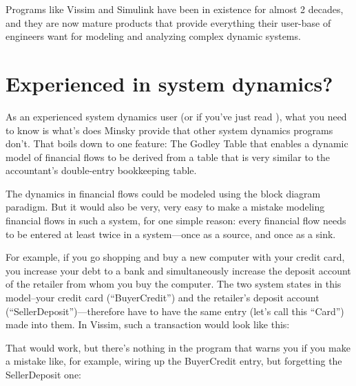 \begin{center}
\end{center}

Programs like Vissim and Simulink have been in existence for almost 2
decades, and they are now mature products that provide everything
their user-base of engineers want for modeling and analyzing complex
dynamic systems. 

\section{Experienced in system dynamics?}
\label{intro:experienced}

As an experienced system dynamics user (or if you've just read ), what you need to know is what's does Minsky
provide that other system dynamics programs don't. That boils down to
one feature: The Godley Table that enables a dynamic model of
financial flows to be derived from a table that is very similar to the
accountant's double-entry bookkeeping table.


The dynamics in financial flows could be modeled using the block diagram
paradigm. But it would also be very, very easy to make a mistake
modeling financial flows in such a system, for one simple reason:
every financial flow needs to be entered at least twice in a
system---once as a source, and once as a sink.


For example, if you go shopping and buy a new computer with your
credit card, you increase your debt to a bank and simultaneously
increase the deposit account of the retailer from whom you buy the
computer. The two system states in this model--your credit card
(``BuyerCredit'') and the retailer's deposit account
(``SellerDeposit'')---therefore have to have the same entry (let's call
this ``Card'') made into them. In Vissim, such a transaction would look
like this:


\begin{center}
\end{center}

That would work, but there's nothing in the program that warns you if
you make a mistake like, for example, wiring up the BuyerCredit entry,
but forgetting the SellerDeposit one:

\begin{center}
\end{center}

